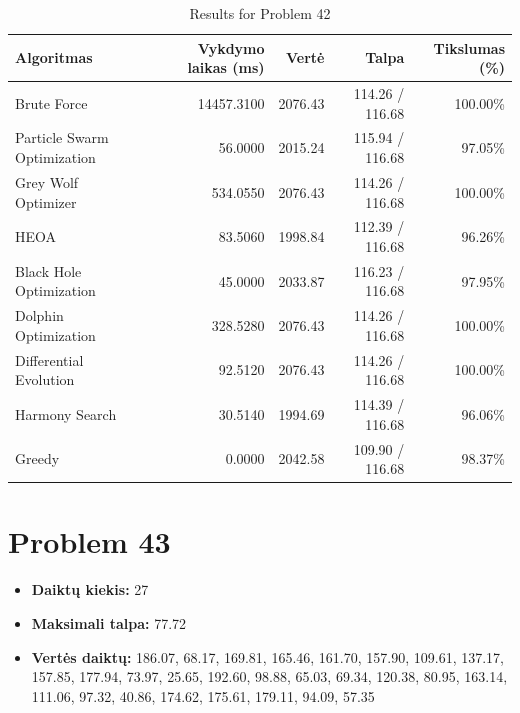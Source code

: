 \documentclass[a4paper,11pt]{article}
\begin{document}
\begin{table}[h!]
\centering
\begin{tabular}{lrrrr}
\toprule
\textbf{Algoritmas} & \textbf{Vykdymo laikas (ms)} & \textbf{Vertė} & \textbf{Talpa} & \textbf{Tikslumas (\%)} \\
\midrule
Brute Force & 14457.3100 & 2076.43 & 114.26 / 116.68 & 100.00\% \\
Particle Swarm Optimization & 56.0000 & 2015.24 & 115.94 / 116.68 & 97.05\% \\
Grey Wolf Optimizer & 534.0550 & 2076.43 & 114.26 / 116.68 & 100.00\% \\
HEOA & 83.5060 & 1998.84 & 112.39 / 116.68 & 96.26\% \\
Black Hole Optimization & 45.0000 & 2033.87 & 116.23 / 116.68 & 97.95\% \\
Dolphin Optimization & 328.5280 & 2076.43 & 114.26 / 116.68 & 100.00\% \\
Differential Evolution & 92.5120 & 2076.43 & 114.26 / 116.68 & 100.00\% \\
Harmony Search & 30.5140 & 1994.69 & 114.39 / 116.68 & 96.06\% \\
Greedy & 0.0000 & 2042.58 & 109.90 / 116.68 & 98.37\% \\
\bottomrule
\end{tabular}
\caption{Results for Problem 42}
\end{table}
\clearpage

\section*{Problem 43}
\begin{itemize}
    \item \textbf{Daiktų kiekis:} 27
    \item \textbf{Maksimali talpa:} 77.72
    \item \textbf{Vertės daiktų:} 186.07, 68.17, 169.81, 165.46, 161.70, 157.90, 109.61, 137.17, 157.85, 177.94, 73.97, 25.65, 192.60, 98.88, 65.03, 69.34, 120.38, 80.95, 163.14, 111.06, 97.32, 40.86, 174.62, 175.61, 179.11, 94.09, 57.35
\end{itemize}
\end{document}
